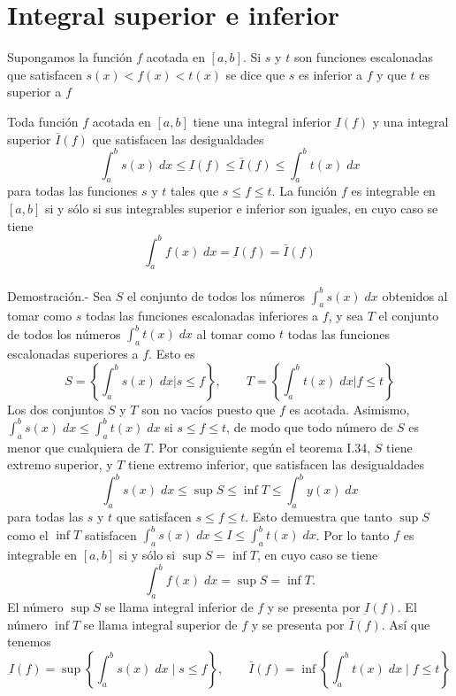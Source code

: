 \section{Integral superior e inferior}

\begin{tcolorbox}
    \begin{def.}
	Supongamos la función $f$ acotada en $[a,b]$. Si $s$ y $t$ son funciones escalonadas que satisfacen $s(x)<f(x)<t(x)$ se dice que $s$ es inferior a $f$ y que $t$ es superior a $f$
    \end{def.}
\end{tcolorbox}

\begin{teo}
    Toda función $f$ acotada en $[a,b]$ tiene una integral inferior $\underbar{I}(f)$ y una integral superior $\bar{I}(f)$ que satisfacen las desigualdades $$\int_a^b s(x) \; dx \leq \underbar{I}(f) \leq \bar{I}(f) \leq \int_a^b t(x) \; dx$$ 
    para todas las funciones $s$ y $t$ tales que $s\leq f\leq t$. La función $f$ es integrable en $[a,b]$ si y sólo si sus integrables superior e inferior son iguales, en cuyo caso se tiene $$\int_a^b f(x) \; dx = \underbar{I}(f)=\bar{I}(f)$$\\
    Demostración.-\; Sea $S$ el conjunto de todos los números $\int_a^b s(x)\; dx$ obtenidos al tomar como $s$ todas las funciones escalonadas inferiores a $f$, y sea $T$ el conjunto de todos los números $\int_a^b t(x)\; dx$ al tomar como $t$ todas las funciones escalonadas superiores a $f$. Esto es $$ S=\left\{ \int_a^b s(x)\; dx | s\leq f\right\}, \qquad T=\left\{ \int_a^b t(x)\; dx | f\leq t\right\}$$ 
    Los dos conjuntos $S$ y $T$ son no vacíos puesto que $f$ es acotada. Asimismo, $\int_a^b s(x)\; dx \leq \int_a^b t(x)\; dx$ si $s\leq f \leq t$, de modo que todo número de $S$ es menor que cualquiera de $T$. Por consiguiente según el teorema I.34, $S$ tiene extremo superior, y $T$ tiene extremo inferior, que satisfacen las desigualdades $$\int_a^b s(x)\; dx \leq \sup S \leq \inf T \leq \int_a^b y(x)\; dx$$
    para todas las $s$ y $t$ que satisfacen $s\leq f\leq t$. Esto demuestra que tanto $\sup S$ como el $\inf T$ satisfacen $\int_a^b s(x)\; dx \leq I\leq \int_a^b t(x)\; dx$. Por lo tanto $f$ es integrable en $[a,b]$ si y sólo si $\sup S = \inf T$, en cuyo caso se tiene $$\int_a^b f(x)\; dx = \sup S = \inf T.$$
    El número $\sup S$ se llama integral inferior de $f$ y se presenta por $\underbar{I}(f)$. El número $\inf T$ se llama integral superior de $f$ y se presenta por $\bar{I}(f)$. Así que tenemos 
    $$\underbar{I}(f)=\sup \left\{\int_a^b s(x) \; dx \; | \; s\leq f\right\}, \qquad \bar{I}(f)=\inf \left\{\int_a^b t(x) \; dx \; | \; f\leq t\right\}$$\\\\
\end{teo}

